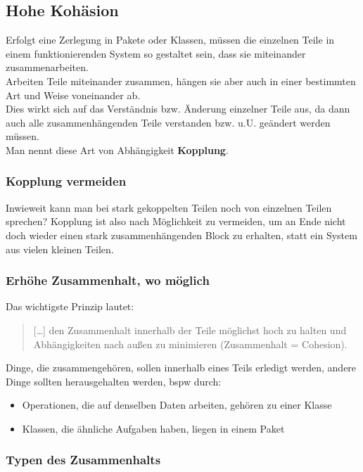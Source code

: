 \subsection{Hohe Kohäsion}
Erfolgt eine Zerlegung in Pakete oder Klassen, müssen die einzelnen Teile in einem funktionierenden System so gestaltet sein, dass sie miteinander zusammenarbeiten.\\
Arbeiten Teile miteinander zusammen, hängen sie aber auch in einer bestimmten Art und Weise voneinander ab.\\
Dies wirkt sich auf das Verständnis bzw. Änderung einzelner Teile aus, da dann auch alle zusammenhängenden Teile verstanden bzw. u.U. geändert werden müssen.\\

\noindent
Man nennt diese Art von Abhängigkeit \textbf{Kopplung}.

\subsubsection*{Kopplung vermeiden}
Inwieweit kann man bei stark gekoppelten Teilen noch von einzelnen Teilen sprechen? Kopplung ist also nach Möglichkeit zu vermeiden, um an Ende nicht doch wieder einen stark zusammenhängenden Block zu erhalten, statt ein System aus vielen kleinen Teilen.

\subsubsection*{Erhöhe Zusammenhalt, wo möglich}
Das wichtigste Prinzip lautet:

\blockquote[{\cite[71]{Wed09b}}]{
[\ldots] den Zusammenhalt innerhalb der Teile möglichst hoch zu halten und Abhängigkeiten nach außen zu minimieren (Zusammenhalt = Cohesion).
}
\noindent
Dinge, die zusammengehören, sollen innerhalb eines Teils erledigt werden, andere Dinge sollten herausgehalten werden, bspw durch:

\begin{itemize}
    \item Operationen, die auf denselben Daten arbeiten, gehören zu einer Klasse
    \item Klassen, die ähnliche Aufgaben haben, liegen in einem Paket
\end{itemize}

\subsubsection*{Typen des Zusammenhalts}

